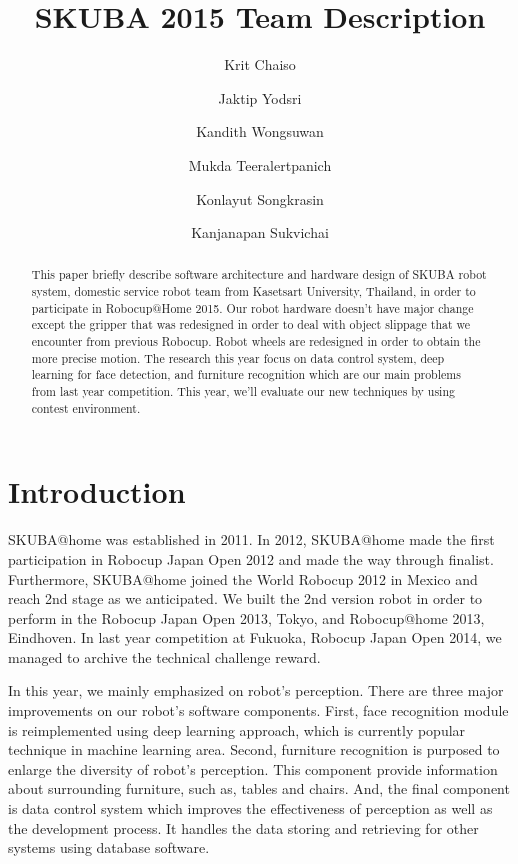 \documentclass{llncs}
\begin{document}
\title{SKUBA 2015 Team Description}
\author{Krit Chaiso
\and Jaktip Yodsri
\and Kandith Wongsuwan
\and Mukda Teeralertpanich
\and Konlayut Songkrasin \and Kanjanapan Sukvichai
}


\maketitle

\begin{abstract}
This paper briefly describe software architecture and hardware design of SKUBA robot system, domestic service robot team from Kasetsart University, Thailand, in order to participate in Robocup@Home 2015. Our robot hardware doesn't have major change except the gripper that was redesigned in order to deal with object slippage that we encounter from previous Robocup. Robot wheels are redesigned in order to obtain the more precise motion. The research this year focus on data control system, deep learning for face detection, and furniture recognition which are our main problems from last year competition. This year, we'll evaluate our new techniques by using contest environment.
\end{abstract}

\section{Introduction}

SKUBA@home was established in 2011. In 2012, SKUBA@home made the first participation in Robocup Japan Open 2012 and made the way through finalist. Furthermore, SKUBA@home joined the World Robocup 2012 in Mexico and reach 2nd stage as we anticipated. We built the 2nd version robot in order to perform in the Robocup Japan Open 2013, Tokyo, and Robocup@home 2013, Eindhoven. In last year competition at Fukuoka, Robocup Japan Open 2014, we managed to archive the technical challenge reward.

In this year, we mainly emphasized on robot's perception. There are three major improvements on our robot's software components. First, face recognition module is reimplemented using deep learning approach, which is currently popular technique in machine learning area. Second, furniture recognition is purposed to enlarge the diversity of robot's perception. This component provide information about surrounding furniture, such as, tables and chairs. And, the final component is data control system which improves the effectiveness of perception as well as the development process. It handles the data storing and retrieving for other systems using database software.
\end{document}
